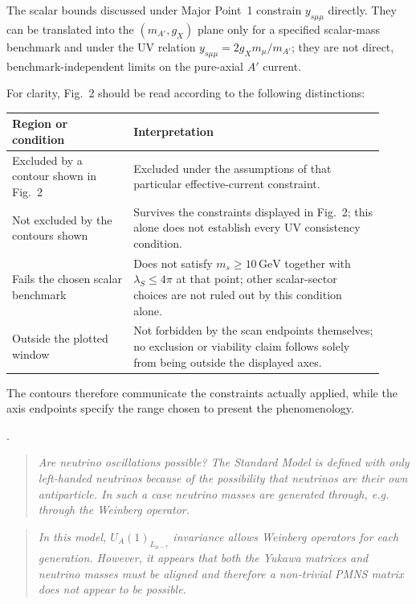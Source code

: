\documentclass[12pt,a4paper]{article}
\begin{document}
The scalar bounds discussed under Major Point~1 constrain \(y_{s\mu\mu}\) directly. They can be translated into the \((m_{A'},g_X)\) plane only for a specified scalar-mass benchmark and under the UV relation \(y_{s\mu\mu}=2g_Xm_\mu/m_{A'}\); they are not direct, benchmark-independent limits on the pure-axial \(A'\) current.

For clarity, Fig.~2 should be read according to the following distinctions:
\begin{center}
\small
\begin{tabular}{p{0.30\linewidth}p{0.62\linewidth}}
\hline
Region or condition & Interpretation \\
\hline
Excluded by a contour shown in Fig.~2 & Excluded under the assumptions of that particular effective-current constraint. \\
Not excluded by the contours shown & Survives the constraints displayed in Fig.~2; this alone does not establish every UV consistency condition. \\
Fails the chosen scalar benchmark & Does not satisfy \(m_s\geq10\,\mathrm{GeV}\) together with \(\lambda_S\leq4\pi\) at that point; other scalar-sector choices are not ruled out by this condition alone. \\
Outside the plotted window & Not forbidden by the scan endpoints themselves; no exclusion or viability claim follows solely from being outside the displayed axes. \\
\hline
\end{tabular}
\end{center}
The contours therefore communicate the constraints actually applied, while the axis endpoints specify the range chosen to present the phenomenology.


\medskip
{}.

\begin{quote}\itshape
Are neutrino oscillations possible? The Standard Model is defined with only left-handed neutrinos because of the possibility that neutrinos are their own antiparticle. In such a case neutrino masses are generated through, e.g. through the Weinberg operator.
\end{quote}

\medskip
{}

\begin{quote}\itshape
In this model, \(U_A(1)_{L_{\mu-\tau}}\) invariance allows Weinberg operators for each generation. However, it appears that both the Yukawa matrices and neutrino masses must be aligned and therefore a non-trivial PMNS matrix does not appear to be possible.
\end{quote}
\end{document}
